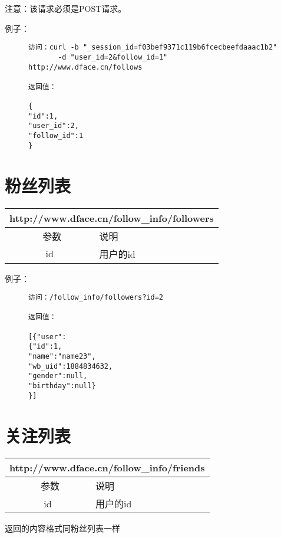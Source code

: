 \documentclass[cs4size]{ctexartutf8}
\begin{document}
注意：该请求必须是POST请求。

例子：

\begin{figure}[H]
\begin{verbatim}
访问：curl -b "_session_id=f03bef9371c119b6fcecbeefdaaac1b2"
       -d "user_id=2&follow_id=1" http://www.dface.cn/follows

返回值：

{
"id":1,
"user_id":2,
"follow_id":1
}

\end{verbatim}
\end{figure}



\section{粉丝列表}

\begin{table}[H]
   \begin{center}
\begin{tabular}{|c|p{12cm}|}
\hline
\multicolumn{2}{|c|}{http://www.dface.cn/follow\_info/followers} \\
\hline\hline
 \  参数  &  说明  \\
\hline
 id  &  用户的id\\
\hline

\end{tabular}
   \end{center}
\end{table}

例子：

\begin{figure}[H]
\begin{verbatim}
访问：/follow_info/followers?id=2

返回值：

[{"user":
{"id":1,
"name":"name23",
"wb_uid":1884834632,
"gender":null,
"birthday":null}
}]

\end{verbatim}
\end{figure}





\section{关注列表}

\begin{table}[H]
   \begin{center}
\begin{tabular}{|c|p{12cm}|}
\hline
\multicolumn{2}{|c|}{http://www.dface.cn/follow\_info/friends} \\
\hline\hline
 \  参数  &  说明  \\
\hline
 id  &  用户的id\\
\hline

\end{tabular}
   \end{center}
\end{table}

返回的内容格式同粉丝列表一样


\newpage
\end{document}
